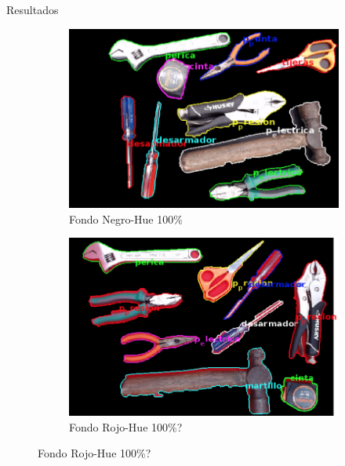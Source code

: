 \documentclass[
  24pt, %
]{beamer}
\begin{document}
\begin{frame}{Resultados}
\begin{figure}[h]
\begin{subfigure}{0.4\linewidth}
    \includegraphics[width=\linewidth]{resultados_colores/resultado_negro_hue_1}
    \caption{Fondo Negro-Hue 100\%}
  \end{subfigure}
  \begin{subfigure}{0.4\linewidth}
    \includegraphics[width=\linewidth]{resultados_colores/resultado_rojo_hue_1}
    \caption{Fondo Rojo-Hue 100\%?}
  \end{subfigure}
  \label{fig:1}
\end{figure}
  
\end{frame}
\end{document}
